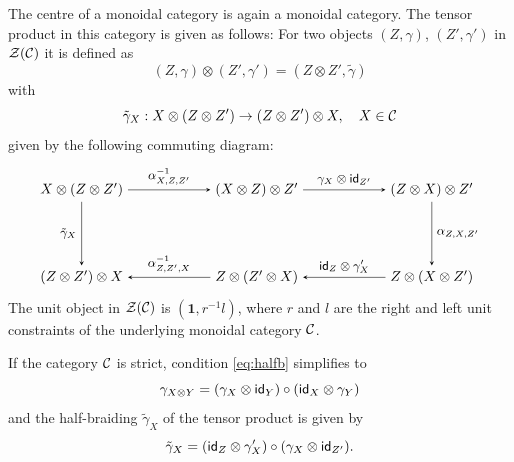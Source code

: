 	The centre of a monoidal category is again a monoidal category. The tensor product in this category is given as follows: For two objects $(Z,\gamma)$, $(Z',\gamma')$ in $\mathcal{Z}({\mathcal{C}})$ it is defined as
		\begin{equation}
			(Z,\gamma)\otimes (Z',\gamma')=(Z\otimes Z',\tilde{\gamma})
		\end{equation}
	with
		\begin{equation}
			\tilde{\gamma}_X:X\otimes(Z\otimes Z')\to(Z\otimes Z')\otimes X,\hspace{10pt}X\in{\mathcal{C}}
		\end{equation}
	given by the following commuting diagram:
		\begin{equation}
			\begin{tikzpicture}[scale=1.1,baseline=(current bounding box.center)]
				\node (1) at (0,0) {$X\otimes(Z\otimes Z')$};
				\node (2) at (4,0) {$(X\otimes Z)\otimes Z'$};
				\node (3) at (8,0) {$(Z\otimes X)\otimes Z'$};
				\node (4) at (8,-2) {$Z\otimes(X\otimes Z')$};
				\node (5) at (4,-2) {$Z\otimes(Z'\otimes X)$};
				\node (6) at (0,-2) {$(Z\otimes Z')\otimes X$};
				\draw[->,>=stealth] (1) to node[above] {\small $\alpha_{X,Z,Z'}^{-1}$} (2);
				\draw[->,>=stealth] (2) to node[above] {\small $\gamma_X\otimes\id_{Z'}$} (3);
				\draw[->,>=stealth] (3) to node[right] {\small $\alpha_{Z,X,Z'}$} (4);
				\draw[->,>=stealth] (4) to node[above] {\small $\id_Z\otimes\gamma_X'$} (5);
				\draw[->,>=stealth] (5) to node[above] {\small $\alpha_{Z,Z',X}^{-1}$} (6);
				\draw[->,>=stealth] (1) to node[left] {\small $\tilde{\gamma}_X$} (6);
			\end{tikzpicture}
		\end{equation}
	The unit object in $\mathcal{Z}({\mathcal{C}})$ is $(\mathbf{1},r^{-1}l)$, where $r$ and $l$ are the right and left unit constraints of the underlying monoidal category ${\mathcal{C}}$.
	
	\begin{rem}
		If the category ${\mathcal{C}}$ is strict, condition \cref{eq:halfb} simplifies to 
			\begin{equation}
				\gamma_{X\otimes Y}=(\gamma_X\otimes\mathsf{id}_Y)\circ(\mathsf{id}_X\otimes \gamma_Y)
			\end{equation}
		and the half-braiding $\tilde{\gamma}_X$ of the tensor product is given by
			\begin{equation}
				\tilde{\gamma}_X=(\mathsf{id}_Z\otimes\gamma_X')\circ(\gamma_X\otimes\mathsf{id}_{Z'}).
			\end{equation}
	\end{rem}

